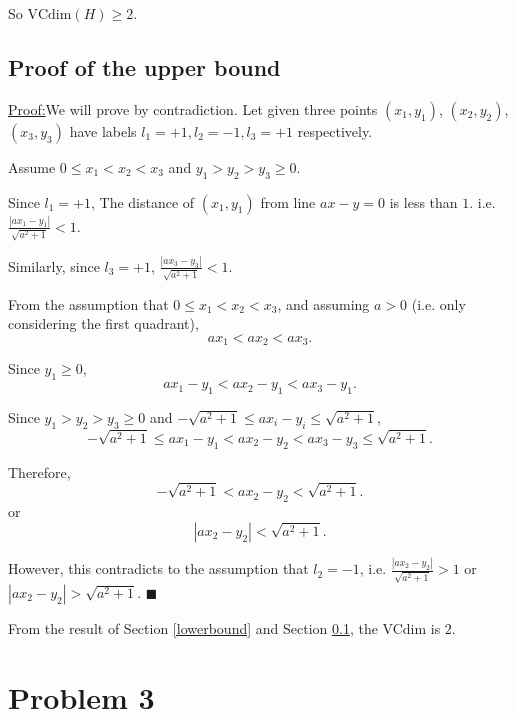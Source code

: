 \documentclass[11pt]{article}
\newenvironment{claim}[1]{\par\noindent\underline{Claim:}\space#1}{}
\newenvironment{claimproof}[1]{\par\noindent\underline{Proof:}\space#1}{\hfill $\blacksquare$}
\begin{document}
So $\mbox{VCdim}(H) \geq 2$.

\subsection{Proof of the upper bound}
\label{upperbound}


\begin{claimproof}
We will prove by contradiction. Let given three points $(x_1, y_1)$, $(x_2, y_2)$, $(x_3, y_3)$ have labels ${l_1 = +1, l_2 = -1, l_3 = +1}$ respectively.

Assume $0 \leq x_1 < x_2 < x_3$ and $y_1 > y_2 > y_3 \geq 0$.

Since $l_1 = +1$, The distance of $(x_1, y_1)$ from line $ax - y = 0$ is less than $1$. i.e. $\frac{|ax_1 - y_1|}{\sqrt{a^2 + 1}} < 1$.

Similarly, since $l_3 = +1$, $\frac{|ax_3 - y_3|}{\sqrt{a^2 + 1}} < 1$.

From the assumption that $0 \leq x_1 < x_2 < x_3$, and assuming $a > 0$ (i.e. only considering the first quadrant), $$ax_1 < ax_2 < ax_3.$$ 

Since $y_1 \geq 0$, $$ax_1 - y_1 < ax_2 - y_1 < ax_3 - y_1.$$

Since $y_1 > y_2 > y_3 \geq 0$ and $-\sqrt{a^2 + 1} \leq ax_i - y_i \leq \sqrt{a^2 + 1}$, 
$$ -\sqrt{a^2 + 1} \leq ax_1 - y_1 < ax_2 - y_2 < ax_3 - y_3 \leq \sqrt{a^2 + 1}.$$

Therefore,
$$ -\sqrt{a^2 + 1} < ax_2 - y_2 < \sqrt{a^2 + 1}.$$
or
$$ |ax_2 - y_2| < \sqrt{a^2 + 1}.$$

However, this contradicts to the assumption that $l_2 = -1$, i.e. $\frac{|ax_2 - y_2|}{\sqrt{a^2 + 1}} > 1$ or $|ax_2 - y_2| > \sqrt{a^2 + 1}$.
\end{claimproof}

From the result of Section \ref{lowerbound} and Section \ref{upperbound}, the VCdim is $2$.


\section{Problem 3}
\end{document}
